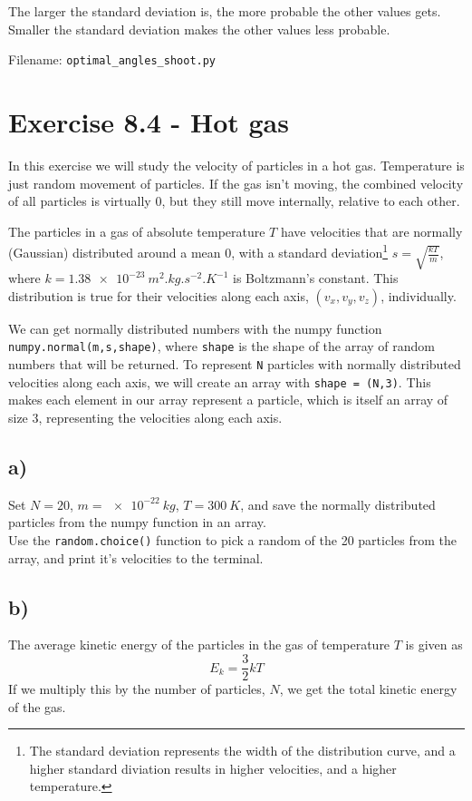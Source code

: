 \documentclass[10pt,a4paper]{article}
\begin{document}
The larger the standard deviation is, the more probable the other values gets. Smaller the standard deviation makes the other values less probable.  

Filename: \texttt{optimal\_angles\_shoot.py}





\section*{Exercise 8.4 - Hot gas}

In this exercise we will study the velocity of particles in a hot gas. Temperature is just random movement of particles. If the gas isn't moving, the combined velocity of all particles is virtually 0, but they still move internally, relative to each other.

The particles in a gas of absolute temperature $T$ have velocities that are normally (Gaussian) distributed around a mean 0, with a standard deviation\footnote{The standard deviation represents the width of the distribution curve, and a higher standard diviation results in higher velocities, and a higher temperature.} $s = \sqrt{\frac{kT}{m}}$, where $k = \SI{1.38e-23}{m^2.kg.s^{-2}.K^{-1}}$ is Boltzmann's constant. This distribution is true for their velocities along each axis, $(v_x,v_y,v_z)$, individually.

We can get normally distributed numbers with the numpy function \texttt{numpy.normal(m,s,shape)}, where \texttt{shape} is the shape of the array of random numbers that will be returned. To represent \texttt{N} particles with normally distributed velocities along each axis, we will create an array with \texttt{shape = (N,3)}. This makes each element in our array represent a particle, which is itself an array of size 3, representing the velocities along each axis.


\subsection*{a)}
Set $N = 20$, $m = \SI{e-22}{kg}$, $T = \SI{300}{K}$, and save the normally distributed particles from the numpy function in an array.\\
Use the \texttt{random.choice()} function to pick a random of the 20 particles from the array, and print it's velocities to the terminal.


\subsection*{b)}
The average kinetic energy of the particles in the gas of temperature $T$ is given as
\[	E_k = \frac{3}{2}kT
\]
If we multiply this by the number of particles, $N$, we get the total kinetic energy of the gas.
\end{document}
